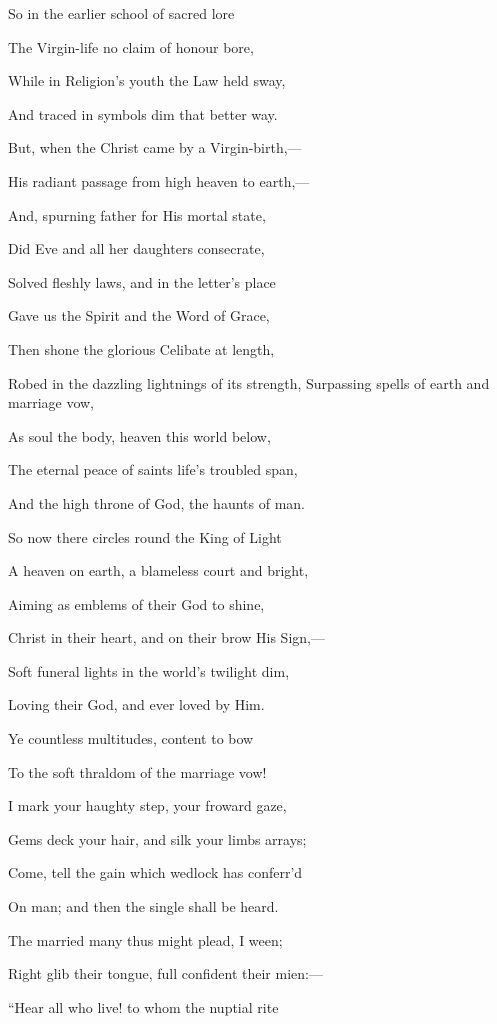 So in the earlier school of sacred lore

The Virgin-life no claim of honour bore,

While in Religion's youth the Law held sway,

And traced in symbols dim that better way.

But, when the Christ came by a Virgin-birth,—

His radiant passage from high heaven to earth,—

And, spurning father for His mortal state,

Did Eve and all her daughters consecrate,

Solved fleshly laws, and in the letter's place

Gave us the Spirit and the Word of Grace,

Then shone the glorious Celibate at length,

Robed in the dazzling lightnings of its strength, Surpassing spells of earth and marriage vow,

As soul the body, heaven this world below,

The eternal peace of saints life's troubled span,

And the high throne of God, the haunts of man.

So now there circles round the King of Light

A heaven on earth, a blameless court and bright,

Aiming as emblems of their God to shine,

Christ in their heart, and on their brow His Sign,—

Soft funeral lights in the world's twilight dim,

Loving their God, and ever loved by Him.

Ye countless multitudes, content to bow

To the soft thraldom of the marriage vow!

I mark your haughty step, your froward gaze,

Gems deck your hair, and silk your limbs arrays;

Come, tell the gain which wedlock has conferr'd

On man; and then the single shall be heard.

The married many thus might plead, I ween;

Right glib their tongue, full confident their mien:—

``Hear all who live! to whom the nuptial rite

